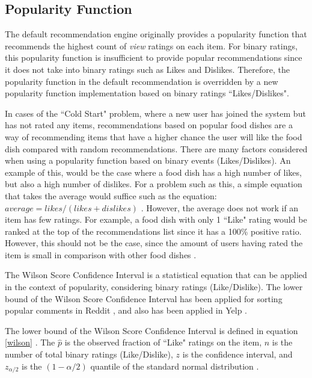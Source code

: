 \subsection{Popularity Function} \label{subsection:popularity}

The default recommendation engine originally provides a popularity function that recommends the highest count of \textit{view} ratings on each item. For binary ratings, this popularity function is insufficient to provide popular recommendations since it does not take into binary ratings such as Likes and Dislikes. Therefore, the popularity function in the default recommendation is overridden by a new popularity function implementation based on binary ratings ``Likes/Dislikes". 

In cases of the ``Cold Start" problem, where a new user has joined the system but has not rated any items, recommendations based on popular food dishes are a way of recommending items that have a higher chance the user will like the food dish compared with random recommendations. There are many factors considered when using a popularity function based on binary events (Likes/Dislikes). An example of this, would be the case where a food dish has a high number of likes, but also a high number of dislikes. For a problem such as this, a simple equation that takes the average would suffice such as the equation: $average= likes/(likes+dislikes)$ \cite{popularity}. However, the average does not work if an item has few ratings. For example, a food dish with only 1 ``Like" rating would be ranked at the top of the recommendations list since it has a 100\% positive ratio. However, this should not be the case, since the amount of users having rated the item is small in comparison with other food dishes \cite{popularity}. 

The Wilson Score Confidence Interval \cite{wilson1927probable, popularity} is a statistical equation that can be applied in the context of popularity, considering binary ratings (Like/Dislike). The lower bound of the Wilson Score Confidence Interval has been applied for sorting popular comments in Reddit \cite{reddit}, and also has been applied in Yelp \cite{yelp_pop}.

The lower bound of the Wilson Score Confidence Interval is defined in equation \ref{wilson}  \cite{wilson1927probable, popularity}. The $\hat{p}$ is the observed fraction of ``Like" ratings on the item, $n$ is the number of total binary ratings (Like/Dislike), $z$ is the confidence interval, and $z_{\alpha/2}$ is the $(1-\alpha/2)$ quantile of the standard normal distribution \cite{popularity}.    

